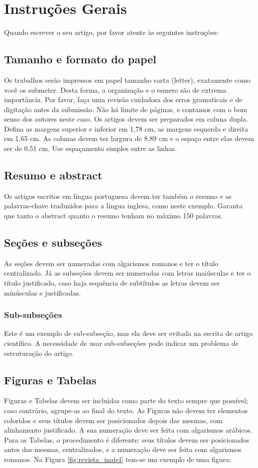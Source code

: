 \section{Instruções Gerais}
Quando escrever o seu artigo, por favor atente às seguintes instruções:

\subsection{Tamanho e formato do papel}
Os trabalhos serão impressos em papel tamanho carta (letter), exatamente como você os submeter. Desta forma, a organização e o esmero são de extrema importância. Por favor, faça uma revisão cuidadosa dos erros gramaticais e de digitação antes da submissão. Não há limite de páginas, e contamos com o bom senso dos autores neste caso. Os artigos devem ser preparados em coluna dupla. Defina as margens superior e inferior em 1,78 cm, as margens esquerda e direita em 1,65 cm. As colunas devem ter largura de 8,89 cm e o espaço entre elas devem ser de 0,51 cm. Use espaçamento simples entre as linhas.

\subsection{Resumo e abstract}
Os artigos escritos em língua portuguesa devem ter também o resumo e as palavras-chave traduzidos para a língua inglesa, como neste exemplo. Garanta que tanto o abstract quanto o resumo tenham no máximo 150 palavras.

\subsection{Seções e subseções}
As seções devem ser numeradas com algarismos romanos e ter o título centralizado. Já as subseções devem ser numeradas com letras maiúsculas e ter o título justificado, caso haja sequência de subtítulos as letras devem ser minúsculas e justificadas. 

\subsubsection{Sub-subseções}
Este é um exemplo de sub-subseção, mas ela deve ser evitada na escrita de artigo científico. A necessidade de usar sub-subseções pode indicar um problema de estruturação do artigo.

\subsection{Figuras e Tabelas}
Figuras e Tabelas devem ser incluídas como parte do texto sempre que possível; caso contrário, agrupe-as ao final do texto. As Figuras não devem ter elementos coloridos e seus títulos devem ser posicionados depois das mesmas, com alinhamento justificado. A sua numeração deve ser feita com algarismos arábicos. Para as Tabelas, o procedimento é diferente: seus títulos devem ser posicionados antes das mesmas, centralizados, e a numeração deve ser feita com algarismos romanos. Na Figura \ref{fig:revista_inatel} tem-se um exemplo de uma figura:

